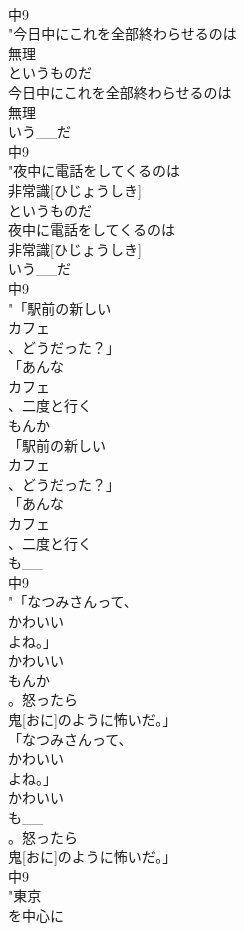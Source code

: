 \documentclass[8pt]{extreport}
\begin{document}
\begin{CJK}{UTF8}{min}
\\	中9
\\	"今日中にこれを全部終わらせるのは
\\	無理
\\	というものだ
\\	今日中にこれを全部終わらせるのは
\\	無理
\\	いう__だ
\\	中9
\\	"夜中に電話をしてくるのは
\\	非常識[ひじょうしき]
\\	というものだ
\\	夜中に電話をしてくるのは
\\	非常識[ひじょうしき]
\\	いう__だ
\\	中9
\\	"「駅前の新しい
\\	カフェ
\\	、どうだった？」
\\	「あんな
\\	カフェ
\\	、二度と行く
\\	もんか
\\	「駅前の新しい
\\	カフェ
\\	、どうだった？」
\\	「あんな
\\	カフェ
\\	、二度と行く
\\	も__
\\	中9
\\	"「なつみさんって、
\\	かわいい
\\	よね。」
\\	かわいい
\\	もんか
\\	。怒ったら
\\	鬼[おに]のように怖いだ。」
\\	「なつみさんって、
\\	かわいい
\\	よね。」
\\	かわいい
\\	も__
\\	。怒ったら
\\	鬼[おに]のように怖いだ。」
\\	中9
\\	"東京
\\	を中心に

\end{CJK}
\end{document}
